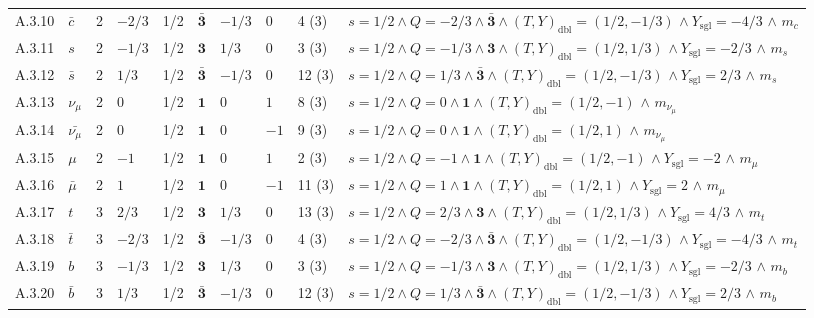 {\begin{longtable}{@{}lllllllll>{\raggedright\arraybackslash}p{7.4cm}@{}}
A.3.10 & $\bar{c}$ & 2 & $-2/3$ & 1/2 & $\bar{\mathbf{3}}$ & $-1/3$ & $0$ & 4 (3) & $s{=}1/2 \wedge Q{=}-2/3 \wedge \bar{\mathbf{3}} \wedge (T,Y)_{\mathrm{dbl}}{=}(1/2,-1/3)$ $\wedge\ Y_{\mathrm{sgl}}{=}-4/3$ $\wedge$ $m_{c}$ \\
A.3.11 & $s$ & 2 & $-1/3$ & 1/2 & $\mathbf{3}$ & $1/3$ & $0$ & 3 (3) & $s{=}1/2 \wedge Q{=}-1/3 \wedge \mathbf{3} \wedge (T,Y)_{\mathrm{dbl}}{=}(1/2,1/3)$ $\wedge\ Y_{\mathrm{sgl}}{=}-2/3$ $\wedge$ $m_{s}$ \\
A.3.12 & $\bar{s}$ & 2 & $1/3$ & 1/2 & $\bar{\mathbf{3}}$ & $-1/3$ & $0$ & 12 (3) & $s{=}1/2 \wedge Q{=}1/3 \wedge \bar{\mathbf{3}} \wedge (T,Y)_{\mathrm{dbl}}{=}(1/2,-1/3)$ $\wedge\ Y_{\mathrm{sgl}}{=}2/3$ $\wedge$ $m_{s}$ \\
A.3.13 & $\nu_\mu$ & 2 & $0$ & 1/2 & $\mathbf{1}$ & $0$ & $1$ & 8 (3) & $s{=}1/2 \wedge Q{=}0 \wedge \mathbf{1} \wedge (T,Y)_{\mathrm{dbl}}{=}(1/2,-1)$ $\wedge$ $m_{\nu_\mu}$ \\
A.3.14 & $\bar{\nu_\mu}$ & 2 & $0$ & 1/2 & $\mathbf{1}$ & $0$ & $-1$ & 9 (3) & $s{=}1/2 \wedge Q{=}0 \wedge \mathbf{1} \wedge (T,Y)_{\mathrm{dbl}}{=}(1/2,1)$ $\wedge$ $m_{\nu_\mu}$ \\
A.3.15 & $\mu$ & 2 & $-1$ & 1/2 & $\mathbf{1}$ & $0$ & $1$ & 2 (3) & $s{=}1/2 \wedge Q{=}-1 \wedge \mathbf{1} \wedge (T,Y)_{\mathrm{dbl}}{=}(1/2,-1)$ $\wedge\ Y_{\mathrm{sgl}}{=}-2$ $\wedge$ $m_{\mu}$ \\
A.3.16 & $\bar{\mu}$ & 2 & $1$ & 1/2 & $\mathbf{1}$ & $0$ & $-1$ & 11 (3) & $s{=}1/2 \wedge Q{=}1 \wedge \mathbf{1} \wedge (T,Y)_{\mathrm{dbl}}{=}(1/2,1)$ $\wedge\ Y_{\mathrm{sgl}}{=}2$ $\wedge$ $m_{\mu}$ \\
A.3.17 & $t$ & 3 & $2/3$ & 1/2 & $\mathbf{3}$ & $1/3$ & $0$ & 13 (3) & $s{=}1/2 \wedge Q{=}2/3 \wedge \mathbf{3} \wedge (T,Y)_{\mathrm{dbl}}{=}(1/2,1/3)$ $\wedge\ Y_{\mathrm{sgl}}{=}4/3$ $\wedge$ $m_{t}$ \\
A.3.18 & $\bar{t}$ & 3 & $-2/3$ & 1/2 & $\bar{\mathbf{3}}$ & $-1/3$ & $0$ & 4 (3) & $s{=}1/2 \wedge Q{=}-2/3 \wedge \bar{\mathbf{3}} \wedge (T,Y)_{\mathrm{dbl}}{=}(1/2,-1/3)$ $\wedge\ Y_{\mathrm{sgl}}{=}-4/3$ $\wedge$ $m_{t}$ \\
A.3.19 & $b$ & 3 & $-1/3$ & 1/2 & $\mathbf{3}$ & $1/3$ & $0$ & 3 (3) & $s{=}1/2 \wedge Q{=}-1/3 \wedge \mathbf{3} \wedge (T,Y)_{\mathrm{dbl}}{=}(1/2,1/3)$ $\wedge\ Y_{\mathrm{sgl}}{=}-2/3$ $\wedge$ $m_{b}$ \\
A.3.20 & $\bar{b}$ & 3 & $1/3$ & 1/2 & $\bar{\mathbf{3}}$ & $-1/3$ & $0$ & 12 (3) & $s{=}1/2 \wedge Q{=}1/3 \wedge \bar{\mathbf{3}} \wedge (T,Y)_{\mathrm{dbl}}{=}(1/2,-1/3)$ $\wedge\ Y_{\mathrm{sgl}}{=}2/3$ $\wedge$ $m_{b}$ \\

\end{longtable}}
